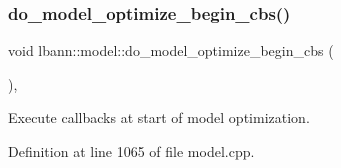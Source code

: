 \mbox{\label{classlbann_1_1model_a19c96544ccf733646f3454be887f3a08}} 
\subsubsection{\texorpdfstring{do\+\_\+model\+\_\+optimize\+\_\+begin\+\_\+cbs()}{do\_model\_optimize\_begin\_cbs()}}
{\footnotesize\ttfamily void lbann\+::model\+::do\+\_\+model\+\_\+optimize\+\_\+begin\+\_\+cbs (\begin{DoxyParamCaption}{ }\end{DoxyParamCaption})\hspace{0.3cm}{\ttfamily [protected]}, {\ttfamily [virtual]}}

Execute callbacks at start of model optimization. 

Definition at line 1065 of file model.\+cpp.


